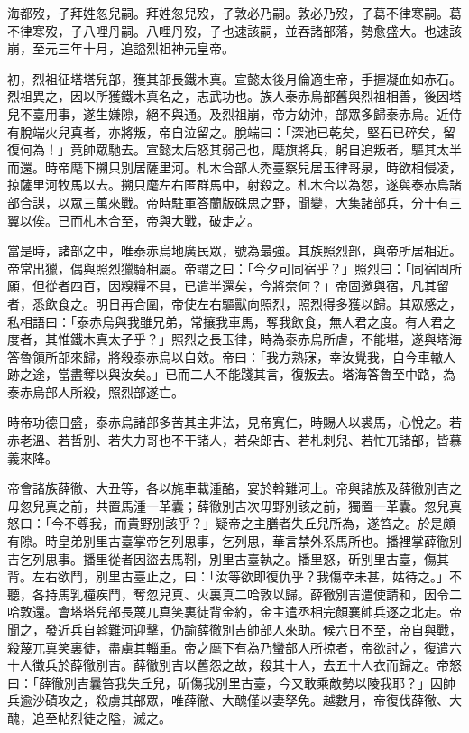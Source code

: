 \begin{pinyinscope}
 海都歿，子拜姓忽兒嗣。拜姓忽兒歿，子敦必乃嗣。敦必乃歿，子葛不律寒嗣。葛不律寒歿，子八哩丹嗣。八哩丹歿，子也速該嗣，並吞諸部落，勢愈盛大。也速該崩，至元三年十月，追謚烈祖神元皇帝。



 初，烈祖征塔塔兒部，獲其部長鐵木真。宣懿太後月倫適生帝，手握凝血如赤石。烈祖異之，因以所獲鐵木真名之，志武功也。族人泰赤烏部舊與烈祖相善，後因塔兒不臺用事，遂生嫌隙，絕不與通。及烈祖崩，帝方幼沖，部眾多歸泰赤烏。近侍有脫端火兒真者，亦將叛，帝自泣留之。脫端曰：「深池已乾矣，堅石已碎矣，留復何為！」竟帥眾馳去。宣懿太后怒其弱己也，麾旗將兵，躬自追叛者，驅其太半而還。時帝麾下搠只別居薩里河。札木合部人禿臺察兒居玉律哥泉，時欲相侵凌，掠薩里河牧馬以去。搠只麾左右匿群馬中，射殺之。札木合以為怨，遂與泰赤烏諸部合謀，以眾三萬來戰。帝時駐軍答蘭版硃思之野，聞變，大集諸部兵，分十有三翼以俟。已而札木合至，帝與大戰，破走之。



 當是時，諸部之中，唯泰赤烏地廣民眾，號為最強。其族照烈部，與帝所居相近。帝常出獵，偶與照烈獵騎相屬。帝謂之曰：「今夕可同宿乎？」照烈曰：「同宿固所願，但從者四百，因糗糧不具，已遣半還矣，今將奈何？」帝固邀與宿，凡其留者，悉飲食之。明日再合圍，帝使左右驅獸向照烈，照烈得多獲以歸。其眾感之，私相語曰：「泰赤烏與我雖兄弟，常攘我車馬，奪我飲食，無人君之度。有人君之度者，其惟鐵木真太子乎？」照烈之長玉律，時為泰赤烏所虐，不能堪，遂與塔海答魯領所部來歸，將殺泰赤烏以自效。帝曰：「我方熟寐，幸汝覺我，自今車轍人跡之途，當盡奪以與汝矣。」已而二人不能踐其言，復叛去。塔海答魯至中路，為泰赤烏部人所殺，照烈部遂亡。



 時帝功德日盛，泰赤烏諸部多苦其主非法，見帝寬仁，時賜人以裘馬，心悅之。若赤老溫、若哲別、若失力哥也不干諸人，若朵郎吉、若札剌兒、若忙兀諸部，皆慕義來降。



 帝會諸族薛徹、大丑等，各以旄車載湩酪，宴於斡難河上。帝與諸族及薛徹別吉之毋忽兒真之前，共置馬湩一革囊；薛徹別吉次毋野別該之前，獨置一革囊。忽兒真怒曰：「今不尊我，而貴野別該乎？」疑帝之主膳者失丘兒所為，遂笞之。於是頗有隙。時皇弟別里古臺掌帝乞列思事，乞列思，華言禁外系馬所也。播裡掌薛徹別吉乞列思事。播里從者因盜去馬靷，別里古臺執之。播里怒，斫別里古臺，傷其背。左右欲鬥，別里古臺止之，曰：「汝等欲即復仇乎？我傷幸未甚，姑待之。」不聽，各持馬乳橦疾鬥，奪忽兒真、火裏真二哈敦以歸。薛徹別吉遣使請和，因令二哈敦還。會塔塔兒部長蔑兀真笑裏徒背金約，金主遣丞相完顏襄帥兵逐之北走。帝聞之，發近兵自斡難河迎擊，仍諭薛徹別吉帥部人來助。候六日不至，帝自與戰，殺蔑兀真笑裏徒，盡虜其輜重。帝之麾下有為乃蠻部人所掠者，帝欲討之，復遣六十人徵兵於薛徹別吉。薛徹別吉以舊怨之故，殺其十人，去五十人衣而歸之。帝怒曰：「薛徹別吉曩笞我失丘兒，斫傷我別里古臺，今又敢乘敵勢以陵我耶？」因帥兵逾沙磧攻之，殺虜其部眾，唯薛徹、大醜僅以妻孥免。越數月，帝復伐薛徹、大醜，追至帖烈徒之隘，滅之。




\end{pinyinscope}
